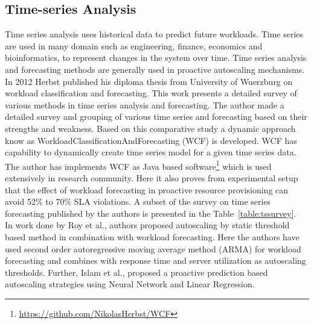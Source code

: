 \subsection{Time-series Analysis}
\label{sub:Time-series Analysis}
Time series analysis uses historical data to predict future workloads. Time series are used in many domain such as engineering, finance, economics and bioinformatics, to represent changes in the system over time. Time series analysis and forecasting methods are generally used in proactive autoscaling mechanisms. In 2012 Herbst\cite{herbst2012workload} published his diploma thesis from University of Wuerzburg on workload classification and forecasting. This work presents a detailed survey of various methods in time series analysis and forecasting. The author made a detailed survey and grouping of various time series and  forecasting based on their strengths and weakness. Based on this comparative study a dynamic approach know as WorkloadClassificationAndForecasting (WCF)\cite{herbst2012workload} is developed. WCF\cite{herbst2012workload} has capability to dynamically create time series model for a given time series data. The author has implements WCF as Java based software\footnote{\url{https://github.com/NikolasHerbst/WCF}} which is used extensively in research community. Here\cite{herbst2012workload} it also proves from experimental setup that the effect of workload forecasting in proactive resource provisioning can avoid 52\% to 70\% SLA violations. A subset of the survey on time series forecasting published by the authors\cite{herbst2012workload} is presented in the Table~\ref{table:tssurvey}.
\\
In work done by Roy et al.\cite{roy2011efficient}, authors proposed autoscaling by static threshold based method in combination with workload forecasting. Here the authors have used second order autoregressive moving average method (ARMA) for workload forecasting and combines with response time and server utilization as autoscaling thresholds. Further, Islam et al.\cite{islam2012empirical}, proposed a proactive prediction based autoscaling strategies using Neural Network and Linear Regression.
